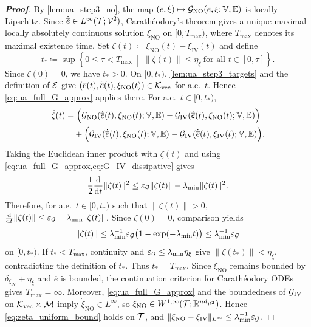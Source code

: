\begin{proof}[\bf Proof]
By \cref{lem:ua_step3_no}, the map $(\dot{\overline e},\xi)\mapsto {\mathcal{G}}_{\mathrm{NO}}(\dot{\overline e},\xi;\mathbb{V},\mathbb{E})$ is locally Lipschitz. Since $\dot{\overline e}\in L^\infty({\mathcal{T}};{\mathcal{V}}^2)$, Carath\'eodory's theorem gives a unique maximal {locally} absolutely continuous solution $\xi_{\mathrm{NO}}$ on $[0,T_{\max})$, where $T_{\max}$ denotes its maximal existence time. Set $\zeta(t)\coloneqq \xi_{\mathrm{NO}}(t)-\xi_{\mathrm{IV}}(t)$ and define
\begin{equation*}
t_*\coloneqq \sup\left\{{0\le\tau<T_{\max}}\ \middle|\ \|\zeta(t)\|\le \eta_\xi\ \text{for all }t\in[0,\tau]\right\}.
\end{equation*}
Since $\zeta(0)=0$, we have $t_*>0$. On {$[0,t_*)$}, \cref{lem:ua_step3_targets} and the definition of ${\mathcal{E}}$ give $(\overline e(t),\dot{\overline e}(t),\xi_{\mathrm{NO}}(t))\in{\mathcal{K}}_{\mathrm{vec}}$ for a.e.\ $t$. Hence \cref{eq:ua_full_G_approx} applies there. For a.e.\ {$t\in[0,t_*)$},
\begin{align*}
\dot\zeta(t)
&=
\Big({\mathcal{G}}_{\mathrm{NO}}(\dot{\overline e}(t),\xi_{\mathrm{NO}}(t);\mathbb{V},\mathbb{E})
-{\mathcal{G}}_{\mathrm{IV}}(\dot{\overline e}(t),\xi_{\mathrm{NO}}(t);\mathbb{V},\mathbb{E})\Big)\\
&\quad+
\Big({\mathcal{G}}_{\mathrm{IV}}(\dot{\overline e}(t),\xi_{\mathrm{NO}}(t);\mathbb{V},\mathbb{E})
-{\mathcal{G}}_{\mathrm{IV}}(\dot{\overline e}(t),\xi_{\mathrm{IV}}(t);\mathbb{V},\mathbb{E})\Big).
\end{align*}
Taking the Euclidean inner product with $\zeta(t)$ and using \cref{eq:ua_full_G_approx,eq:G_IV_dissipative} gives
\begin{equation*}
\frac{1}{2}\frac{\mathrm{d}}{\mathrm{d}t}\|\zeta(t)\|^2
\le \varepsilon_{{\mathcal{G}}}\|\zeta(t)\| - \lambda_{\min}\|\zeta(t)\|^2.
\end{equation*}
Therefore, for a.e.\ {$t\in[0,t_*)$} such that $\|\zeta(t)\|>0$, $\frac{\mathrm{d}}{\mathrm{d}t}\|\zeta(t)\|\le \varepsilon_{{\mathcal{G}}}-\lambda_{\min}\|\zeta(t)\|$. Since $\zeta(0)=0$, comparison yields
\begin{equation}\label{eq:zeta_uniform_bound}
\|\zeta(t)\|\le \lambda_{\min}^{-1}\varepsilon_{{\mathcal{G}}}\big(1-\exp(-\lambda_{\min}t)\big)\le \lambda_{\min}^{-1}\varepsilon_{{\mathcal{G}}}
\end{equation}
on {$[0,t_*)$. If $t_*<T_{\max}$, continuity and $\varepsilon_{{\mathcal{G}}}\le\lambda_{\min}\eta_\xi$ give $\|\zeta(t_*)\|<\eta_\xi$, contradicting the definition of $t_*$. Thus $t_*=T_{\max}$. Since $\xi_{\mathrm{NO}}$ remains bounded by $\delta_{\xi_{\mathrm{IV}}}+\eta_\xi$ and $\dot{\overline e}$ is bounded, the continuation criterion for Carath\'eodory ODEs gives $T_{\max}=\infty$. Moreover, \cref{eq:ua_full_G_approx} and the boundedness of ${\mathcal{G}}_{\mathrm{IV}}$ on ${\mathcal{K}}_{\mathrm{vec}}\times{\mathcal{M}}$ imply $\dot\xi_{\mathrm{NO}}\in L^\infty$, so $\xi_{\mathrm{NO}}\in W^{1,\infty}({\mathcal{T}};\mathbb{R}^{nd_{{\mathcal{V}}^2}})$.} Hence \cref{eq:zeta_uniform_bound} holds on ${\mathcal{T}}$, and $\|\xi_{\mathrm{NO}}-\xi_{\mathrm{IV}}\|_{L^\infty}\le \lambda_{\min}^{-1}\varepsilon_{{\mathcal{G}}}$.


\end{proof}
